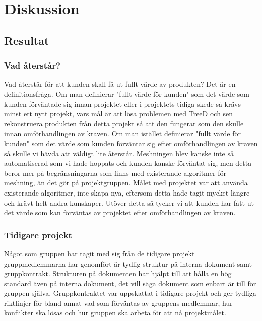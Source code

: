\chapter{Diskussion}
\label{cha:discussion}

\section{Resultat}
\label{sec:discussion-results}

\subsection{Vad återstår?}
Vad återstår för att kunden skall få ut fullt värde av
produkten? Det är en definitionsfråga. Om man definierar "fullt värde för kunden" som det värde som kunden förväntade sig innan projektet eller i projektets tidiga skede så krävs minst ett nytt projekt, vars mål är att lösa problemen med TreeD och sen rekonstruera produkten från detta projekt så att den fungerar som den skulle innan omförhandlingen av kraven. Om man istället definierar "fullt värde för kunden" som det värde som kunden förväntar sig efter omförhandlingen av kraven så skulle vi hävda att väldigt lite återstår. Meshningen blev kanske inte så automatiserad som vi hade hoppats och kunden kanske förväntat sig, men detta beror mer på begränsningarna som finns med existerande algoritmer för meshning, än det gör på projektgruppen. Målet med projektet var att använda existerande algoritmer, inte skapa nya, eftersom detta hade tagit mycket längre och krävt helt andra kunskaper. Utöver detta så tycker vi att kunden har fått ut det värde som kan förväntas av projektet efter omförhandlingen av kraven. 

\subsection{Tidigare projekt}

Något som gruppen har tagit med sig från de tidigare projekt gruppmedlemmarna har genomfört är tydlig struktur på interna dokument samt gruppkontrakt. Strukturen på dokumenten har hjälpt till att hålla en hög standard även på interna dokument, det vill säga dokument som enbart är till för gruppen själva. Gruppkontraktet var uppskattat i tidigare projekt och ger tydliga riktlinjer för bland annat vad som förväntas av gruppens medlemmar, hur konflikter ska lösas och hur gruppen ska arbeta för att nå projektmålet.

